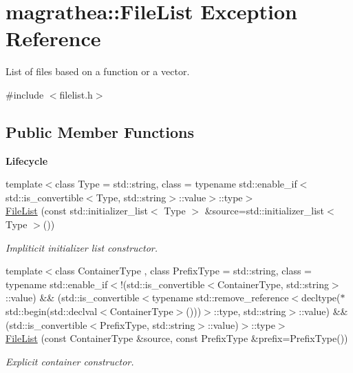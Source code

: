 \hypertarget{exceptionmagrathea_1_1FileList}{\section{magrathea\-:\-:File\-List Exception Reference}
\label{exceptionmagrathea_1_1FileList}
}


List of files based on a function or a vector.  




{\ttfamily \#include $<$filelist.\-h$>$}

\subsection*{Public Member Functions}
\begin{Indent}{\bf Lifecycle}\par
\begin{DoxyCompactItemize}
\item 
{\footnotesize template$<$class Type  = std\-::string, class  = typename std\-::enable\-\_\-if$<$std\-::is\-\_\-convertible$<$\-Type, std\-::string$>$\-::value$>$\-::type$>$ }\\\hyperlink{exceptionmagrathea_1_1FileList_ad6617ba6789e48198f7a80e8d7dbd9cf}{File\-List} (const std\-::initializer\-\_\-list$<$ Type $>$ \&source=std\-::initializer\-\_\-list$<$ Type $>$())
\begin{DoxyCompactList}\small\item\em Impliticit initializer list constructor. \end{DoxyCompactList}\item 
{\footnotesize template$<$class Container\-Type , class Prefix\-Type  = std\-::string, class  = typename std\-::enable\-\_\-if$<$!(std\-::is\-\_\-convertible$<$\-Container\-Type, std\-::string$>$\-::value) \&\& (std\-::is\-\_\-convertible$<$typename std\-::remove\-\_\-reference$<$decltype($\ast$std\-::begin(std\-::declval$<$\-Container\-Type$>$()))$>$\-::type, std\-::string$>$\-::value) \&\& (std\-::is\-\_\-convertible$<$\-Prefix\-Type, std\-::string$>$\-::value)$>$\-::type$>$ }\\\hyperlink{exceptionmagrathea_1_1FileList_a3f6de8ac76c7cd568aa2eb9ea78ec9ef}{File\-List} (const Container\-Type \&source, const Prefix\-Type \&prefix=Prefix\-Type())
\begin{DoxyCompactList}\small\item\em Explicit container constructor. \end{DoxyCompactList}\item 

\end{DoxyCompactItemize}
\end{Indent}
